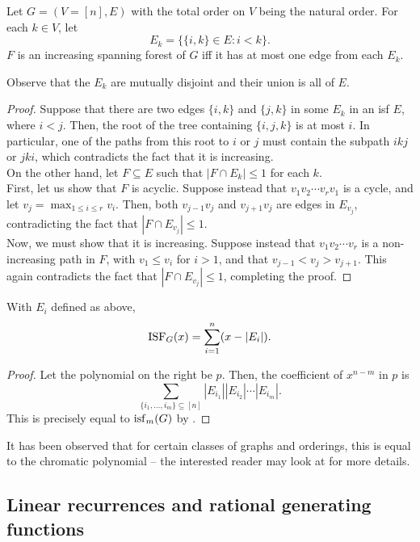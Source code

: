	\begin{flem}
		\label{lemma: isf}
		Let $G = (V=[n],E)$ with the total order on $V$ being the natural order. For each $k \in V$, let
		\[ E_k = \{ \{i,k\} \in E : i<k \}. \]
		$F$ is an increasing spanning forest of $G$ iff it has at most one edge from each $E_k$. 
	\end{flem}
	Observe that the $E_k$ are mutually disjoint and their union is all of $E$.
	\begin{proof}
		Suppose that there are two edges $\{i,k\}$ and $\{j,k\}$ in some $E_k$ in an isf $E$, where $i<j$. Then, the root of the tree containing $\{i,j,k\}$ is at most $i$. In particular, one of the paths from this root to $i$ or $j$ must contain the subpath $ikj$ or $jki$, which contradicts the fact that it is increasing.\\
		
		On the other hand, let $F \subseteq E$ such that $|F \cap E_k| \le 1$ for each $k$.\\
		First, let us show that $F$ is acyclic. Suppose instead that $v_1v_2\cdots v_rv_1$ is a cycle, and let $v_j = \max_{1 \le i \le r} v_i$. Then, both $v_{j-1}v_j$ and $v_{j+1}v_j$ are edges in $E_{v_j}$, contradicting the fact that $|F \cap E_{v_j}| \le 1$.\\
		Now, we must show that it is increasing. Suppose instead that $v_1v_2\cdots v_r$ is a non-increasing path in $F$, with $v_1 \le v_i$ for $i > 1$, and that $v_{j-1} < v_j > v_{j+1}$. This again contradicts the fact that $|F \cap E_{v_j}| \le 1$, completing the proof.
	\end{proof}

	\begin{ftheo}
		\label{theo: isf}
		With $E_i$ defined as above,
		\[ \operatorname{ISF}_G(x) = \sum_{i=1}^n (x-|E_i|). \]
	\end{ftheo}
	\begin{proof}
		Let the polynomial on the right be $p$. Then, the coefficient of $x^{n-m}$ in $p$ is
		\[ \sum_{\{i_1,\ldots,i_m\} \subseteq [n]} |E_{i_1}| |E_{i_2}| \cdots |E_{i_m}|. \]
		This is precisely equal to $\operatorname{isf}_m(G)$ by .
	\end{proof}

	It has been observed that for certain classes of graphs and orderings, this is equal to the chromatic polynomial -- the interested reader may look at \cite{sagan} for more details.

\subsection{Linear recurrences and rational generating functions}

